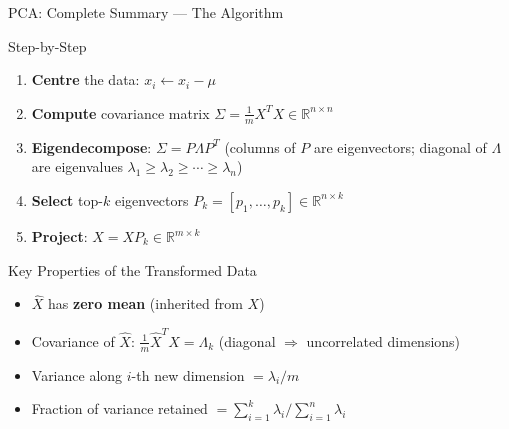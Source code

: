 \documentclass{beamer}
\begin{document}
\begin{frame}[shrink=10]{PCA: Complete Summary --- The Algorithm}
  \begin{block}{Step-by-Step}
    \begin{enumerate}\setlength\itemsep{7pt}
      \item \textbf{Centre} the data: $x_i \leftarrow x_i - \mu$
      \item \textbf{Compute} covariance matrix
            $\Sigma = \tfrac{1}{m}X^TX\in\mathbb{R}^{n\times n}$
      \item \textbf{Eigendecompose}: $\Sigma = P\Lambda P^T$
            (columns of $P$ are eigenvectors; diagonal of $\Lambda$
            are eigenvalues $\lambda_1\geq\lambda_2\geq\cdots\geq\lambda_n$)
      \item \textbf{Select} top-$k$ eigenvectors
            $P_k = [p_1,\ldots,p_k]\in\mathbb{R}^{n\times k}$
      \item \textbf{Project}: $\hat{X} = XP_k\in\mathbb{R}^{m\times k}$
    \end{enumerate}
  \end{block}

  \medskip

  \begin{exampleblock}{Key Properties of the Transformed Data}
    \begin{itemize}\setlength\itemsep{5pt}
      \item $\hat{X}$ has \textbf{zero mean} (inherited from $X$)
      \item Covariance of $\hat{X}$:
            $\tfrac{1}{m}\hat{X}^T\hat{X} = \Lambda_k$
            (diagonal $\Rightarrow$ uncorrelated dimensions)
      \item Variance along $i$-th new dimension
            $= \lambda_i / m$
      \item Fraction of variance retained
            $= \sum_{i=1}^{k}\lambda_i / \sum_{i=1}^{n}\lambda_i$
    \end{itemize}
  \end{exampleblock}
\end{frame}
\end{document}
